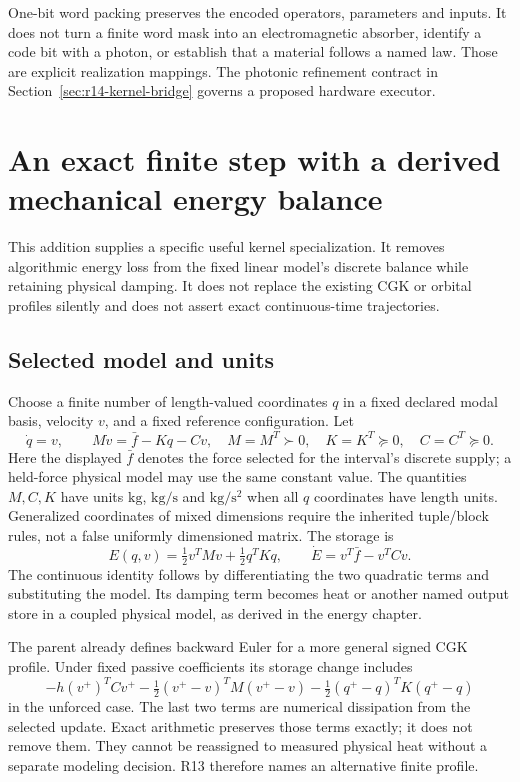 One-bit word packing preserves the encoded operators, parameters and inputs.
It does not turn a finite word mask into an electromagnetic absorber, identify
a code bit with a photon, or establish that a material follows a named law.
Those are explicit realization mappings. The photonic refinement contract in
Section~\ref{sec:r14-kernel-bridge} governs a proposed hardware executor.

\section{An exact finite step with a derived mechanical energy balance}
\label{sec:r13-step}
This addition supplies a specific useful kernel specialization. It removes
algorithmic energy loss from the fixed linear model's discrete balance while
retaining physical damping. It does not replace the existing CGK or orbital
profiles silently and does not assert exact continuous-time trajectories.

\subsection{Selected model and units}
Choose a finite number of length-valued coordinates $q$ in a fixed declared
modal basis, velocity $v$, and a fixed reference configuration. Let
\begin{equation}
 \dot q=v,\qquad M\dot v=\bar f-Kq-Cv,
 \quad M=M^T\succ0,\quad K=K^T\succeq0,\quad C=C^T\succeq0.
 \label{eq:r13-linear-model}
\end{equation}
Here the displayed $\bar f$ denotes the force selected for the interval's
discrete supply; a held-force physical model may use the same constant value.
The quantities $M,C,K$ have units $\mathrm{kg}$, $\mathrm{kg/s}$ and
$\mathrm{kg/s^2}$ when all $q$ coordinates have length units. Generalized
coordinates of mixed dimensions require the inherited tuple/block rules,
not a false uniformly dimensioned matrix. The storage is
\begin{equation}
 E(q,v)=\tfrac12v^TMv+\tfrac12q^TKq,
 \qquad \dot E=v^T\bar f-v^TCv.
 \label{eq:r13-mech-storage}
\end{equation}
The continuous identity follows by differentiating the two quadratic terms
and substituting the model. Its damping term becomes heat or another named
output store in a coupled physical model, as derived in the energy chapter.

The parent already defines backward Euler for a more general signed CGK
profile. Under fixed passive coefficients its storage change includes
\begin{equation}
 -h(v^+)^TCv^+
 -\tfrac12(v^+-v)^TM(v^+-v)
 -\tfrac12(q^+-q)^TK(q^+-q)
\end{equation}
in the unforced case. The last two terms are numerical dissipation from the
selected update. Exact arithmetic preserves those terms exactly; it does not
remove them. They cannot be reassigned to measured physical heat without a
separate modeling decision. R13 therefore names an alternative finite profile.

